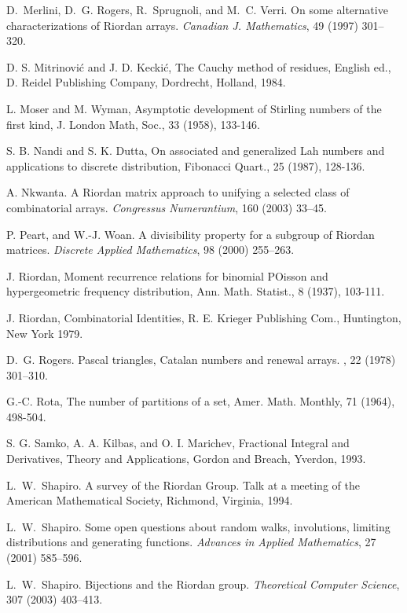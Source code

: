 \begin{thebibliography}{100}
D.~Merlini, D.~G. Rogers, R.~Sprugnoli, and M.~C. Verri.
\newblock On some alternative characterizations of Riordan arrays.
\newblock \emph{Canadian J. Mathematics}, 49 (1997) 301--320.

D. S. Mitrinovi\'c and J. D. Kecki\'c, The Cauchy method of residues, English ed., D. Reidel Publishing Company, Dordrecht, Holland, 1984.

L. Moser and M. Wyman, Asymptotic development of Stirling numbers of the first kind, J. London Math, Soc., 33 (1958), 133-146.

S. B. Nandi and S. K. Dutta, On associated and generalized Lah numbers and applications to discrete distribution, Fibonacci Quart., 25 (1987), 128-136.

A. Nkwanta.
\newblock A {R}iordan matrix approach to unifying a selected class of combinatorial arrays.
\newblock \emph{Congressus Numerantium}, 160 (2003) 33--45.

P. Peart, and W.-J. Woan.
\newblock A divisibility property for a subgroup of Riordan matrices.
\newblock \emph{Discrete Applied Mathematics}, 98 (2000) 255--263.

J. Riordan, Moment recurrence relations for binomial POisson and hypergeometric frequency distribution, Ann. Math. Statist., 8 (1937), 103-111.

J. Riordan, Combinatorial Identities, R. E. Krieger Publishing Com., Huntington, New York 1979.

D.~G. Rogers.
\newblock Pascal triangles, Catalan numbers and renewal arrays.
, 22 (1978) 301--310.

G.-C. Rota, The number of partitions of a set, Amer. Math. Monthly, 71 (1964), 498-504.

S. G. Samko, A. A. Kilbas, and O. I. Marichev, Fractional Integral and Derivatives, Theory and Applications, Gordon and Breach, Yverdon, 1993.

L.~W.~Shapiro.
\newblock A survey of the Riordan Group.
\newblock Talk at a meeting of the American Mathematical Society, Richmond, Virginia, 1994.

L.~W.~Shapiro.
\newblock Some open questions about random walks, involutions, limiting distributions and
generating functions.
\newblock \emph{Advances in Applied Mathematics}, 27 (2001) 585--596.

L.~W.~Shapiro.
\newblock Bijections and the {R}iordan group.
\newblock \emph{Theoretical Computer Science}, 307 (2003) 403--413.


\end{thebibliography}
